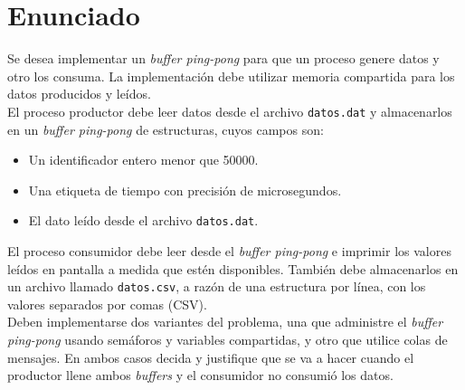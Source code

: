 \section{Enunciado}
Se desea implementar un \textit{buffer ping-pong} para que un proceso genere datos y otro los consuma. La implementación debe utilizar memoria compartida para los datos producidos y leídos.\\

El proceso productor debe leer datos desde el archivo \texttt{datos.dat} y almacenarlos en un \textit{buffer ping-pong} de estructuras, cuyos campos son:\\

\begin{itemize}
    \item Un identificador entero menor que 50000.
    \item Una etiqueta de tiempo con precisión de microsegundos.
    \item El dato leído desde el archivo \texttt{datos.dat}.\\
\end{itemize}

El proceso consumidor debe leer desde el \textit{buffer ping-pong} e imprimir los valores leídos en pantalla a medida que estén disponibles. También debe almacenarlos en un archivo llamado \texttt{datos.csv}, a razón de una estructura por línea, con los valores separados por comas (CSV).\\

Deben implementarse dos variantes del problema, una que administre el \textit{buffer ping-pong} usando semáforos y variables compartidas, y otro que utilice colas de mensajes. En ambos casos decida y justifique que se va a hacer cuando el productor llene ambos \textit{buffers} y el consumidor no consumió los datos.